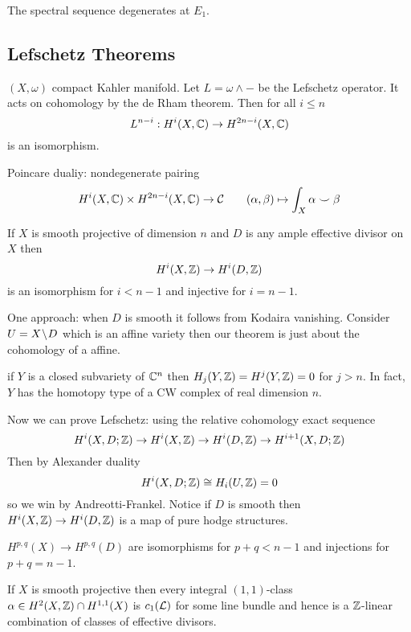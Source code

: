 \documentclass[12pt]{article}
\begin{document}
\begin{theorem}
The spectral sequence degenerates at $E_1$. 
\end{theorem}


\subsection{Lefschetz Theorems}

\begin{theorem}
$(X, \omega)$ compact Kahler manifold. Let $L = \omega \wedge -$ be the Lefschetz operator. It acts on cohomology by the de Rham theorem. Then for all $i \le n$
\[ L^{n-i} : H^i(X, \mathbb{C}) \to H^{2n - i}(X, \mathbb{C}) \]
is an isomorphism. 
\end{theorem}

Poincare dualiy: nondegenerate pairing
\[ H^i(X, \mathbb{C}) \times H^{2n-i}(X, \mathbb{C}) \to \mathcal{C} \quad \quad (\alpha, \beta) \mapsto \int_X \alpha \smile \beta \]

\begin{theorem}
If $X$ is smooth projective of dimension $n$ and $D$ is any ample effective divisor on $X$ then 
\[ H^i(X, \mathbb{Z}) \to H^i(D, \mathbb{Z}) \]
is an isomorphism for $i < n-1$ and injective for $i = n-1$. 
\end{theorem}

One approach: when $D$ is smooth it follows from Kodaira vanishing. Consider $U = X \! \setminus \! D$ which is an affine variety then our theorem is just about the cohomology of a affine. 

\begin{theorem}
if $Y$ is a closed subvariety of $\mathbb{C}^n$ then $H_j(Y, \mathbb{Z}) = H^j(Y, \mathbb{Z}) = 0$ for $j > n$. In fact, $Y$ has the homotopy type of a CW complex of real dimension $n$. 
\end{theorem}
 
 
Now we can prove Lefschetz: using the relative cohomology exact sequence
\[ H^i(X, D; \mathbb{Z}) \to H^i(X, \mathbb{Z}) \to H^i(D, \mathbb{Z}) \to H^{i+1}(X, D; \mathbb{Z}) \] 
Then by Alexander duality
\[ H^i(X, D;\mathbb{Z}) \cong H_i(U, \mathbb{Z}) = 0 \]
so we win by Andreotti-Frankel. Notice if $D$ is smooth then $H^i(X, \mathbb{Z}) \to H^i(D, \mathbb{Z})$ is a map of pure hodge structures. 

\begin{cor}
$H^{p,q}(X) \to H^{p,q}(D)$ are isomorphisms for $p + q < n - 1$ and injections for $p + q = n - 1$. 
\end{cor}

\begin{theorem}[Lefschetz (1,1)]
If $X$ is smooth projective then every integral $(1,1)$-class $\alpha \in H^2(X, \mathbb{Z}) \cap H^{1,1}(X)$ is $c_1(\mathcal{L})$ for some line bundle and hence is a $\mathbb{Z}$-linear combination of classes of effective divisors. 
\end{theorem}
\end{document}
